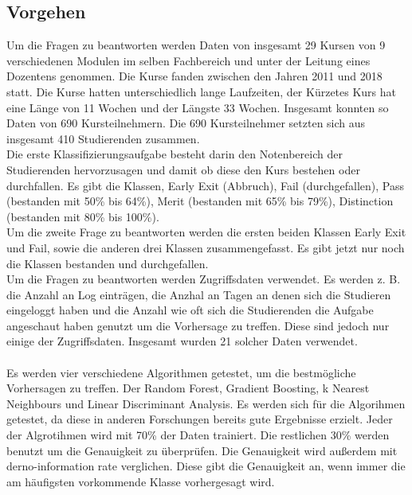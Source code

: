 \subsection{Vorgehen}
Um die Fragen zu beantworten werden Daten von insgesamt 29 Kursen von 9 verschiedenen Modulen im selben Fachbereich und unter der Leitung eines Dozentens genommen.
Die Kurse fanden zwischen den Jahren 2011 und 2018 statt. Die Kurse hatten unterschiedlich lange Laufzeiten, der Kürzetes Kurs hat eine Länge von 11 Wochen und der Längste 33 Wochen.
Insgesamt konnten so Daten von 690 Kursteilnehmern. Die 690 Kursteilnehmer setzten sich aus insgesamt 410 Studierenden zusammen. \cite[S. 6]{Quinn.2020}
\\
\noindent
Die erste Klassifizierungsaufgabe besteht darin den Notenbereich der Studierenden hervorzusagen und damit ob diese den Kurs bestehen oder durchfallen.
Es gibt die Klassen, Early Exit (Abbruch), Fail (durchgefallen), Pass (bestanden mit 50\% bis 64\%), Merit (bestanden mit 65\% bis 79\%), Distinction (bestanden mit 80\% bis 100\%). \cite[S. 6f]{Quinn.2020}
\\ \noindent
Um die zweite Frage zu beantworten werden die ersten beiden Klassen Early Exit und Fail, sowie die anderen drei Klassen zusammengefasst.
Es gibt jetzt nur noch die Klassen bestanden und durchgefallen. \cite[S. 6]{Quinn.2020}
\\
\noindent
Um die Fragen zu beantworten werden Zugriffsdaten verwendet. Es werden z. B. die Anzahl an Log einträgen, die Anzhal an Tagen an denen sich die Studieren eingeloggt haben und die Anzahl wie oft sich die Studierenden die Aufgabe angeschaut haben genutzt um die Vorhersage zu treffen.
Diese sind jedoch nur einige der Zugriffsdaten. Insgesamt wurden 21 solcher Daten verwendet. \cite[S. 7f]{Quinn.2020}
\\
\noindent
\\
\noindent
Es werden vier verschiedene Algorithmen getestet, um die bestmögliche Vorhersagen zu treffen. Der Random Forest, Gradient Boosting, k Nearest
Neighbours und Linear Discriminant Analysis. Es werden sich für die Algorihmen getestet, da diese in anderen Forschungen bereits gute Ergebnisse erzielt.
Jeder der Algrotihmen wird mit 70\% der Daten trainiert. Die restlichen 30\% werden benutzt um die Genauigkeit zu überprüfen.
Die Genauigkeit wird außerdem mit der\glqq no-information rate\grqq{} verglichen. Diese gibt die Genauigkeit an, wenn immer die am häufigsten vorkommende Klasse vorhergesagt wird. \cite[S. 8f]{Quinn.2020}

